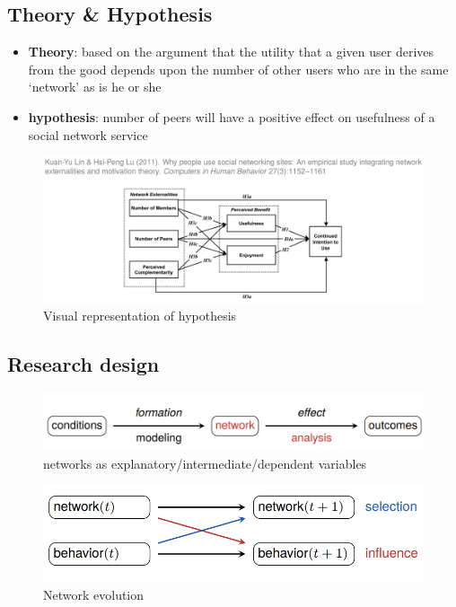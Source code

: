 \documentclass[a4paper,10pt]{article}
\begin{document}
\subsection{Theory \& Hypothesis}
\begin{itemize}
    \item \textbf{Theory}:  based on the argument that the utility that a given user derives from the good depends upon the number of other users who are in the same ‘network’ as is he or she
    \item \textbf{hypothesis}: number of peers will have a positive effect on usefulness of a social network service
\end{itemize}
\begin{figure}[h]
    \centering
    \includegraphics[width=1.3\linewidth]{Images/e3.png}
    \caption{Visual representation of hypothesis}
    \label{fig:enter-label}
\end{figure}
\pagebreak
\subsection{Research design}
\begin{figure}[h]
    \centering
    \includegraphics[width=1\linewidth]{Images/i4.png}
    \caption{networks as explanatory/intermediate/dependent variables}
    \label{fig:enter-label}
\end{figure}
\begin{figure}[h]
    \centering
    \includegraphics[width=1\linewidth]{Images/i5.png}
    \caption{Network evolution}
    \label{fig:enter-label}
\end{figure}
\end{document}
